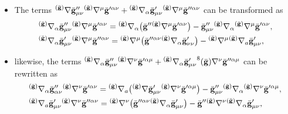 \documentclass[pdftex]{sigma}
\def\grad{{\nabla}}%
\newcommand{\leftexp}[2]{{\vphantom{#2}}^{#1}{#2}}
\def \a{\alpha}
\renewcommand{\gg}{{\bf g}}
\newcommand{\bgg}{{\bar{\bf g}}}
\renewcommand{\a}{\alpha}
\numberwithin{equation}{section}
\begin{document}
\begin{itemize}\itemsep=0pt
\item The terms $\leftexp{(\bar{\gg})}{\grad} \bgg''_{\mu \nu} \leftexp{(\bar{\gg})}{\grad}^\mu \bgg'^{\a \nu} +
\leftexp{(\bar{\gg})}{\grad}_\a \bgg'_{\mu \nu} \leftexp{(\bar{\gg})}{\grad}^\mu \bgg''^{\a \nu} $
can be transformed as
\begin{align*}
&\leftexp{(\bar{\gg})}{\grad}_\a \bgg''_{\mu \nu} \leftexp{(\bar{\gg})}{\grad}^\mu \bgg'^{\a \nu} =
\leftexp{(\bar{\gg})}{\grad}_\a \bigl(\bgg'' \leftexp{(\bar{\gg})}{\grad}^\mu \bgg'^{\a \nu}\bigr) - \bgg''_{\mu \nu} \leftexp{(\bar{\gg})}{\grad}_\a \leftexp{(\bar{\gg})}{\grad}^\mu \bgg'^{\a \nu}, \\
&\leftexp{(\bar{\gg})}{\grad}_\a \bgg'_{\mu \nu} \leftexp{(\bar{\gg})}{\grad}^\mu \bgg''^{\a \nu}=
\leftexp{(\bar{\gg})}{\grad}^\mu \bigl(\bgg''^{\a \nu} \leftexp{(\bar{\gg})}{\grad}_\a \bgg'_{\nu \nu}\bigr)-
\leftexp{(\bar{\gg})}{\grad}^\mu \leftexp{(\bar{\gg})}{\grad}_a \bgg'_{\mu \nu},
\end{align*}

\item likewise, the terms $ \leftexp{(\bar{\gg})}{\grad}_\a \bgg''_{\mu \nu} \leftexp{(\bar{\gg})}{\grad}^\nu \bgg'^{\a \mu} + \leftexp{(\bar{\gg})}{\grad}_\a \bgg'_{ \mu \nu} \leftexp8{(\bar{\gg})}{\grad}^\nu \bgg''^{\a \mu}$ can be rewritten as
\begin{align*}
&\leftexp{(\bar{\gg})}{\grad}_\a \bgg''_{\a \nu} \leftexp{(\bar{\gg})}{\grad}^\nu \bgg'^{ \a \nu}=
\leftexp{(\bar{\gg})}{\grad}_a \bigl(\leftexp{(\bar{\gg})}{\grad} \bgg'_{\mu \nu} \leftexp{(\bar{\gg})}{\grad} ^\nu \bgg'^{ \a \mu }\bigr) - \bgg''_{\mu \nu} \leftexp{(\bar{\gg})}{\grad}_\a \leftexp{(\bar{\gg})}{\grad}^\nu \bgg'^{\a \mu} ,\\
&\leftexp{(\bar{\gg})}{\grad}_a \bgg'_{\mu \nu} \leftexp{(\bar{\gg})}{\grad}^\nu \bgg''^{\a \nu}=
\leftexp{(\bar{\gg})}{\grad}^\nu \bigl(\bgg''^{\a \nu} \leftexp{(\bar{\gg})}{\grad}_\a \bgg'_{\mu \nu}\bigr) -
\bgg'' \leftexp{(\bar{\gg})}{\grad}^\nu \leftexp{(\bar{\gg})}{\grad}_\a \bgg'_{\mu \nu},
\end{align*}


\end{itemize}
\end{document}
